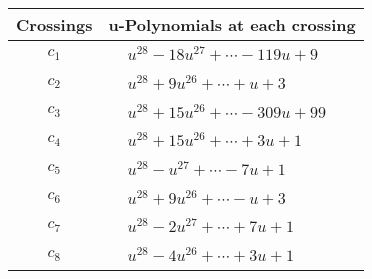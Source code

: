 \documentclass[1p]{elsarticle_modified}
\theoremstyle{definition}
\begin{document}
\begin{tabular}{m{50pt}|m{274pt}}
Crossings & \hspace{64pt}u-Polynomials at each crossing \\
\hline $$\begin{aligned}c_{1}\end{aligned}$$&$\begin{aligned}
&u^{28}-18 u^{27}+\cdots-119 u+9
\end{aligned}$\\
\hline $$\begin{aligned}c_{2}\end{aligned}$$&$\begin{aligned}
&u^{28}+9 u^{26}+\cdots+u+3
\end{aligned}$\\
\hline $$\begin{aligned}c_{3}\end{aligned}$$&$\begin{aligned}
&u^{28}+15 u^{26}+\cdots-309 u+99
\end{aligned}$\\
\hline $$\begin{aligned}c_{4}\end{aligned}$$&$\begin{aligned}
&u^{28}+15 u^{26}+\cdots+3 u+1
\end{aligned}$\\
\hline $$\begin{aligned}c_{5}\end{aligned}$$&$\begin{aligned}
&u^{28}- u^{27}+\cdots-7 u+1
\end{aligned}$\\
\hline $$\begin{aligned}c_{6}\end{aligned}$$&$\begin{aligned}
&u^{28}+9 u^{26}+\cdots- u+3
\end{aligned}$\\
\hline $$\begin{aligned}c_{7}\end{aligned}$$&$\begin{aligned}
&u^{28}-2 u^{27}+\cdots+7 u+1
\end{aligned}$\\
\hline $$\begin{aligned}c_{8}\end{aligned}$$&$\begin{aligned}
&u^{28}-4 u^{26}+\cdots+3 u+1
\end{aligned}$\\

\end{tabular}
\end{document}
